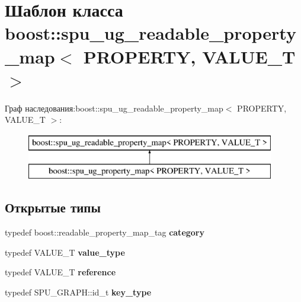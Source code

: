 \hypertarget{classboost_1_1spu__ug__readable__property__map}{}\section{Шаблон класса boost\+:\+:spu\+\_\+ug\+\_\+readable\+\_\+property\+\_\+map$<$ P\+R\+O\+P\+E\+R\+TY, V\+A\+L\+U\+E\+\_\+T $>$}
\label{classboost_1_1spu__ug__readable__property__map}
Граф наследования\+:boost\+:\+:spu\+\_\+ug\+\_\+readable\+\_\+property\+\_\+map$<$ P\+R\+O\+P\+E\+R\+TY, V\+A\+L\+U\+E\+\_\+T $>$\+:\begin{figure}[H]
\begin{center}
\leavevmode
\includegraphics[height=2.000000cm]{classboost_1_1spu__ug__readable__property__map}
\end{center}
\end{figure}
\subsection*{Открытые типы}
\begin{DoxyCompactItemize}
\item 
\mbox{\label{classboost_1_1spu__ug__readable__property__map_a36ae6d9c41a5bafe91283e3ec4104eed}} 
typedef boost\+::readable\+\_\+property\+\_\+map\+\_\+tag {\bfseries category}
\item 
\mbox{\label{classboost_1_1spu__ug__readable__property__map_a251a71f41e97d7384ef97361ea10ddbc}} 
typedef V\+A\+L\+U\+E\+\_\+T {\bfseries value\+\_\+type}
\item 
\mbox{\label{classboost_1_1spu__ug__readable__property__map_a996409eb98a3291d9890dd2fdb622e9b}} 
typedef V\+A\+L\+U\+E\+\_\+T {\bfseries reference}
\item 
\mbox{\label{classboost_1_1spu__ug__readable__property__map_a9089a08c90f76368eb362bc8d8cbdb45}} 
typedef S\+P\+U\+\_\+\+G\+R\+A\+P\+H\+::id\+\_\+t {\bfseries key\+\_\+type}
\end{DoxyCompactItemize}

